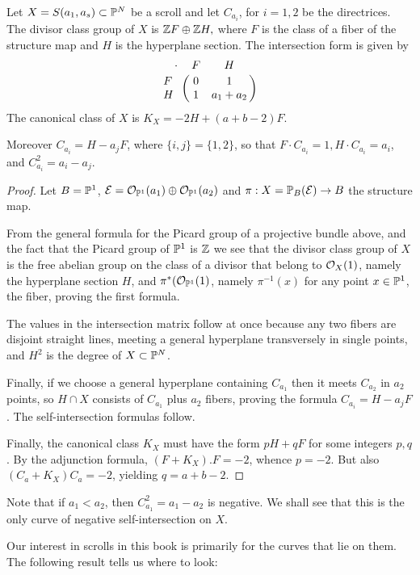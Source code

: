 \begin{theorem}
 Let $X = S(a_{1},a_{s})\subset {\mathbb P}^{N}$ be a scroll and let $C_{a_{i}}$, for $i = 1,2$ be the directrices.
  The divisor
 class group of $X$ is 
 $
  {\mathbb Z} F \oplus {\mathbb Z} H,
 $
where $F$ is the class of a fiber of the structure map and $H$ is the hyperplane section. The
intersection form is given by
$$\bordermatrix{\kern 10pt\cdot&F&H\cr
F&0&1\cr
H&1&a_{1}+a_{2}
}$$
 The canonical class of $X$ is
$K_{X} = -2H+(a+b-2)F$. 

Moreover $C_{a_{i}} = H-a_{j}F$, where $\{i,j\} = \{1,2\}$, so that
 $F\cdot C_{a_{i}} = 1, H\cdot C_{a_{i}} = a_{i}$, and $C_{a_{i}}^{2} = a_{i}-a_{j}$.
\end{theorem}
 
\begin{proof} Let $B= {\mathbb P}^{1}$, ${\mathcal E} = {\mathcal O}_{{\mathbb P}^{1}}(a_{1}) \oplus {\mathcal O}_{{\mathbb P}^{1}}(a_{2})$ and  $\pi: X = {\mathbb P}_{B}({\mathcal E}) \to B$ the structure map.

 From the general formula for the Picard group of a projective bundle above, and the fact that the Picard group of
 ${\mathbb P}^{1}$ is ${\mathbb Z}$ we see that the divisor class group of $X$ is the free abelian group on the class of a divisor that belong to ${\mathcal O}_{X}(1)$, namely the hyperplane section $H$, and $\pi^{*}({\mathcal O}_{{\mathbb P}^{1}}(1)$, namely
 $\pi^{-1}(x)$ for any point $x\in {\mathbb P}^{1}$, the fiber, proving the first formula.

The values in the intersection matrix follow at once because any two fibers are disjoint straight lines, meeting
a general hyperplane transversely in single points, and $H^{2}$ is the degree of $X\subset {\mathbb P}^{N}$.

Finally, if we choose a general hyperplane containing $C_{a_{1}}$ then it meets $C_{a_2}$ in $a_{2}$ points,
so $H\cap X$ consists of $C_{a_{1}}$ plus $a_{2}$ fibers, proving the formula $C_{a_{i}} = H-a_{j}F$.
The self-intersection formulas follow. 

Finally, the canonical class $K_{X}$ must have the form $pH+qF$ for some integers $p,q$. By the adjunction formula,
$(F+K_{X}).F = -2$, whence $p=-2$. But also $(C_{a}+K_{X})C_{a} = -2$, yielding $q = a+b-2$.
\end{proof}

Note that if $a_{1}<a_{2}$, then $C_{a_{1}}^{2} = a_{1}-a_{2}$ is negative. We shall see that this is the only curve of negative self-intersection on $X$.

Our interest in scrolls in this book is primarily for the curves that lie on them. The following result tells us where to look:

